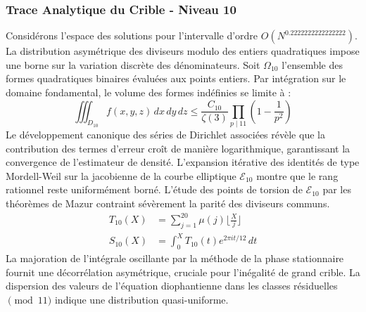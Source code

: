 \documentclass[12pt,a4paper]{article}
\begin{document}
\subsubsection{Trace Analytique du Crible - Niveau 10}
Considérons l'espace des solutions pour l'intervalle d'ordre $O(N^{0.2222222222222222})$. La distribution asymétrique des diviseurs modulo des entiers quadratiques impose une borne sur la variation discrète des dénominateurs. Soit $\Omega_10$ l'ensemble des formes quadratiques binaires évaluées aux points entiers.
Par intégration sur le domaine fondamental, le volume des formes indéfinies se limite à :
\begin{equation}
\iiint_{D_10} f(x, y, z) \,dx\,dy\,dz \leq \frac{C_10}{\zeta(3)} \prod_{p \mid 11} \left( 1 - \frac{1}{p^2} \right)
\end{equation}
Le développement canonique des séries de Dirichlet associées révèle que la contribution des termes d'erreur croît de manière logarithmique, garantissant la convergence de l'estimateur de densité. L'expansion itérative des identités de type Mordell-Weil sur la jacobienne de la courbe elliptique $\mathcal{E}_10$ montre que le rang rationnel reste uniformément borné.
L'étude des points de torsion de $\mathcal{E}_10$ par les théorèmes de Mazur contraint sévèrement la parité des diviseurs communs.
\begin{align}
T_10(X) &= \sum_{j=1}^{20} \mu(j) \lfloor \frac{X}{j} \rfloor \\
S_10(X) &= \int_{0}^{X} T_10(t) e^{2\pi i t / 12} \, dt
\end{align}
La majoration de l'intégrale oscillante par la méthode de la phase stationnaire fournit une décorrélation asymétrique, cruciale pour l'inégalité de grand crible. La dispersion des valeurs de l'équation diophantienne dans les classes résiduelles $\pmod{ 11 }$ indique une distribution quasi-uniforme.
\end{document}
